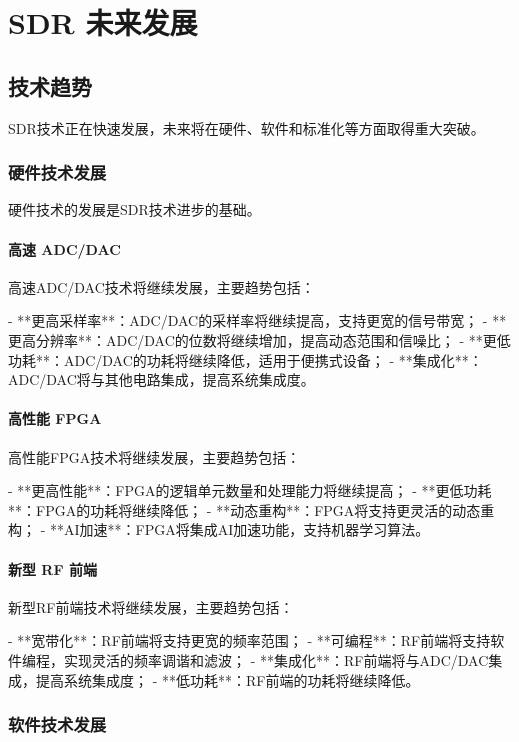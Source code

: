 ﻿\documentclass[UTF8]{ctexbook}
\begin{document}
\chapter{SDR 未来发展}

\section{技术趋势}

SDR技术正在快速发展，未来将在硬件、软件和标准化等方面取得重大突破。

\subsection{硬件技术发展}

硬件技术的发展是SDR技术进步的基础。

\subsubsection{高速 ADC/DAC}

高速ADC/DAC技术将继续发展，主要趋势包括：

- **更高采样率**：ADC/DAC的采样率将继续提高，支持更宽的信号带宽；
- **更高分辨率**：ADC/DAC的位数将继续增加，提高动态范围和信噪比；
- **更低功耗**：ADC/DAC的功耗将继续降低，适用于便携式设备；
- **集成化**：ADC/DAC将与其他电路集成，提高系统集成度。

\subsubsection{高性能 FPGA}

高性能FPGA技术将继续发展，主要趋势包括：

- **更高性能**：FPGA的逻辑单元数量和处理能力将继续提高；
- **更低功耗**：FPGA的功耗将继续降低；
- **动态重构**：FPGA将支持更灵活的动态重构；
- **AI加速**：FPGA将集成AI加速功能，支持机器学习算法。

\subsubsection{新型 RF 前端}

新型RF前端技术将继续发展，主要趋势包括：

- **宽带化**：RF前端将支持更宽的频率范围；
- **可编程**：RF前端将支持软件编程，实现灵活的频率调谐和滤波；
- **集成化**：RF前端将与ADC/DAC集成，提高系统集成度；
- **低功耗**：RF前端的功耗将继续降低。

\subsection{软件技术发展}
\end{document}
